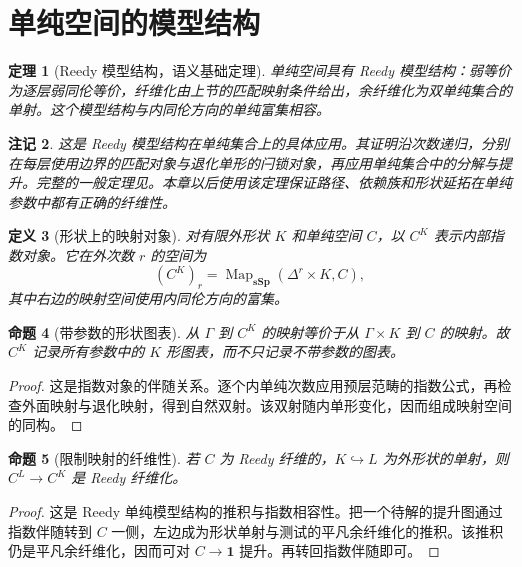 \documentclass[12pt,oneside,openany,fontset=none]{ctexbook}
\theoremstyle{cn}
\newtheorem{definition}{定义}[chapter]
\newtheorem{proposition}[definition]{命题}
\newtheorem{theorem}[definition]{定理}
\newtheorem{remark}[definition]{注记}
\numberwithin{equation}{chapter}
\newcommand{\sSp}{\mathbf{sSp}}
\newcommand{\Map}{\operatorname{Map}}
\newcommand{\one}{\mathbf 1}
\begin{document}
\section{单纯空间的模型结构}
\begin{theorem}[Reedy 模型结构，语义基础定理]
单纯空间具有 Reedy 模型结构：弱等价为逐层弱同伦等价，纤维化由上节的匹配映射条件给出，余纤维化为双单纯集合的单射。这个模型结构与内同伦方向的单纯富集相容。
\end{theorem}
\begin{remark}
这是 Reedy 模型结构在单纯集合上的具体应用。其证明沿次数递归，分别在每层使用边界的匹配对象与退化单形的闩锁对象，再应用单纯集合中的分解与提升。完整的一般定理见\cite{RiehlCatHomotopy,GoerssJardine}。本章以后使用该定理保证路径、依赖族和形状延拓在单纯参数中都有正确的纤维性。
\end{remark}
\begin{definition}[形状上的映射对象]
对有限外形状 $K$ 和单纯空间 $C$，以 $C^K$ 表示内部指数对象。它在外次数 $r$ 的空间为
\[
(C^K)_r=\Map_{\sSp}(\Delta^r\times K,C),
\]
其中右边的映射空间使用内同伦方向的富集。
\end{definition}
\begin{proposition}[带参数的形状图表]
从 $\Gamma$ 到 $C^K$ 的映射等价于从 $\Gamma\times K$ 到 $C$ 的映射。故 $C^K$ 记录所有参数中的 $K$ 形图表，而不只记录不带参数的图表。
\end{proposition}
\begin{proof}
这是指数对象的伴随关系。逐个内单纯次数应用预层范畴的指数公式，再检查外面映射与退化映射，得到自然双射。该双射随内单形变化，因而组成映射空间的同构。
\end{proof}
\begin{proposition}[限制映射的纤维性]
若 $C$ 为 Reedy 纤维的，$K\hookrightarrow L$ 为外形状的单射，则 $C^L\to C^K$ 是 Reedy 纤维化。
\end{proposition}
\begin{proof}
这是 Reedy 单纯模型结构的推积与指数相容性。把一个待解的提升图通过指数伴随转到 $C$ 一侧，左边成为形状单射与测试的平凡余纤维化的推积。该推积仍是平凡余纤维化，因而可对 $C\to\one$ 提升。再转回指数伴随即可。
\end{proof}
\end{document}
